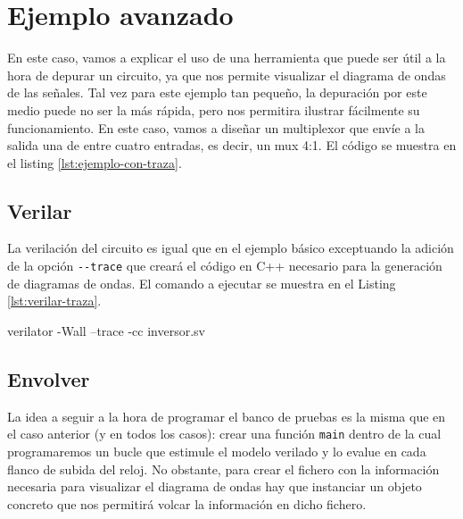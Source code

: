 
\section{Ejemplo avanzado}
En este caso, vamos a explicar el uso de una herramienta que puede ser útil a la hora de depurar un circuito, ya que nos permite visualizar el diagrama de ondas de las señales. Tal vez para este ejemplo tan pequeño, la depuración por este medio puede no ser la más rápida, pero nos permitira ilustrar fácilmente su funcionamiento. En este caso, vamos a diseñar un multiplexor que envíe a la salida una de entre cuatro entradas, es decir, un mux 4:1. El código se muestra en el listing \ref{lst:ejemplo-con-traza}.



\subsection{Verilar}
La verilación del circuito es igual que en el ejemplo básico exceptuando la adición de la opción \verb|--trace| que creará el código en C++ necesario para la generación de diagramas de ondas. El comando a ejecutar se muestra en el Listing \ref{lst:verilar-traza}.

\begin{mycode}[style=bashstyle, label=lst:verilar-traza, caption={Instrucción para verilar el diseño habilitando las trazas.}]
verilator -Wall --trace -cc inversor.sv
\end{mycode}

\subsection{Envolver}
La idea a seguir a la hora de programar el banco de pruebas es la misma que en el caso anterior (y en todos los casos): crear una función \verb|main| dentro de la cual programaremos un bucle que estimule el modelo verilado y lo evalue en cada flanco de subida del reloj. No obstante, para crear el fichero con la información necesaria para visualizar el diagrama de ondas hay que instanciar un objeto concreto que nos permitirá volcar la información en dicho fichero. 

